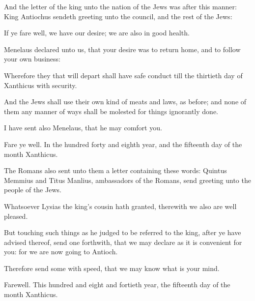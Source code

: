 {\par }{\PP {}And the letter of the king unto the nation of the Jews was after this manner: King Antiochus sendeth greeting unto the council, and the rest of the Jews:
\par }{\PP {}If ye fare well, we have our desire; we are also in good health.
\par }{\PP {}Menelaus declared unto us, that your desire was to return home, and to follow your own business:
\par }{\PP {}Wherefore they that will depart shall have safe conduct till the thirtieth day of Xanthicus with security.
\par }{\PP {}And the Jews shall use their own kind of meats and laws, as before; and none of them any manner of ways shall be molested for things ignorantly done.
\par }{\PP {}I have sent also Menelaus, that he may comfort you.
\par }{\PP {}Fare ye well. In the hundred forty and eighth year, and the fifteenth day of the month Xanthicus.
\par }{\PP {}The Romans also sent unto them a letter containing these words: Quintus Memmius and Titus Manlius, ambassadors of the Romans, send greeting unto the people of the Jews.
\par }{\PP {}Whatsoever Lysias the king’s cousin hath granted, therewith we also are well pleased.
\par }{\PP {}But touching such things as he judged to be referred to the king, after ye have advised thereof, send one forthwith, that we may declare as it is convenient for you: for we are now going to Antioch.
\par }{\PP {}Therefore send some with speed, that we may know what is your mind.
\par }{\PP {}Farewell. This hundred and eight and fortieth year, the fifteenth day of the month Xanthicus.

}

